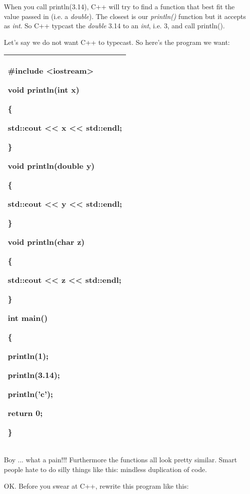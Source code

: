 \documentclass[
]{article}
\begin{document}
When you call println(3.14), C++ will try to find a function that best
fit the value passed in (i.e. a \emph{double}). The closest is our
\emph{println()} function but it accepts as \emph{int}. So C++ typcast
the \emph{double} 3.14 to an \emph{int}, i.e. 3, and call println().

Let's say we do not want C++ to typecast. So here's the program we want:

\begin{longtable}[]{@{}l@{}}
\toprule
\endhead
\begin{minipage}[t]{0.97\columnwidth}\raggedright
\#include \textless iostream\textgreater{}

void println(int x)

\{

std::cout \textless\textless{} x \textless\textless{} std::endl;

\}

void println(double y)

\{

std::cout \textless\textless{} y \textless\textless{} std::endl;

\}

void println(char z)

\{

std::cout \textless\textless{} z \textless\textless{} std::endl;

\}

int main()

\{

println(1);

println(3.14);

println('c');

return 0;

\}\strut
\end{minipage}\tabularnewline
\bottomrule
\end{longtable}

Boy ... what a pain!!! Furthermore the functions all look pretty
similar. Smart people hate to do silly things like this: mindless
duplication of code.

OK. Before you swear at C++, rewrite this program like this:
\end{document}
